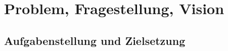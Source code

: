 \chapter{Problem, Fragestellung, Vision}
\label{ch:ProblemFragestellungVision}

\section{Aufgabenstellung und Zielsetzung}
